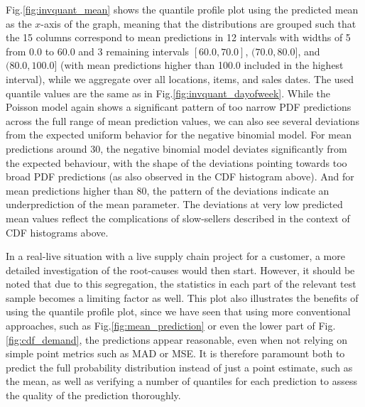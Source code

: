 \documentclass[BCOR=1mm, DIV=calc,10pt,
twoside=true,
twocolumn,
headings=normal]{scrartcl}
\newcommand{\fig}{Fig.}
\begin{document}
\fig \ref{fig:invquant_mean} shows the quantile profile plot using the predicted mean as the $x$-axis of the graph, meaning that the distributions are grouped such that the 15 columns correspond to mean predictions in 12 intervals with widths of 5 from 0.0 to 60.0 and 3 remaining intervals $[60.0, 70.0]$, $(70.0, 80.0]$, and $(80.0, 100.0]$ (with mean predictions higher than 100.0 included in the highest interval), while we aggregate over all locations, items, and sales dates. The used quantile values are the same as in \fig \ref{fig:invquant_dayofweek}. While the Poisson model again shows a significant pattern of too narrow PDF predictions across the full range of mean prediction values, we can also see several deviations from the expected uniform behavior for the negative binomial model. For mean predictions around $30$, the negative binomial model deviates significantly from the expected behaviour, with the shape of the deviations pointing towards too broad PDF predictions (as also observed in the CDF histogram above). And for mean predictions higher than $80$, the pattern of the deviations indicate an underprediction of the mean parameter. The deviations at very low predicted mean values reflect the complications of slow-sellers described in the context of CDF histograms above.

\noindent
In a real-live situation with a live supply chain project for a customer, a more detailed investigation of the root-causes would then start. However, it should be noted that due to this segregation, the statistics in each part of the relevant test sample becomes a limiting factor as well. This plot also illustrates the benefits of using the quantile profile plot, since we have seen that using more conventional approaches, such as \fig \ref{fig:mean_prediction} or even the lower part of \fig \ref{fig:cdf_demand}, the predictions appear reasonable, even when not relying on simple point metrics such as MAD or MSE. It is therefore paramount both to predict the full probability distribution instead of just a point estimate, such as the mean, as well as verifying a number of quantiles for each prediction to assess the quality of the prediction thoroughly.
\end{document}
